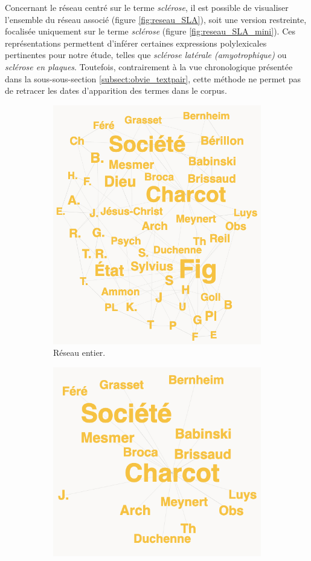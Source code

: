 Concernant le réseau centré sur le terme \textit{sclérose}, il est possible de visualiser l'ensemble du réseau associé (figure \ref{fig:reseau_SLA}), soit une version restreinte, focalisée uniquement sur le terme \textit{sclérose} (figure \ref{fig:reseau_SLA_mini}). Ces représentations permettent d'inférer certaines expressions polylexicales pertinentes pour notre étude, telles que \textit{sclérose latérale (amyotrophique)} ou \textit{sclérose en plaques}. Toutefois, contrairement à la vue chronologique présentée dans la sous-sous-section \ref{subsect:obvie_textpair}, cette méthode ne permet pas de retracer les dates d'apparition des termes dans le corpus. 

\begin{figure}[h]
	\centering
	\begin{subfigure}{.5\textwidth}
		\centering
		\includegraphics[width=.7\linewidth]{img/reseau_noms_propres.png}
		\caption{Réseau entier.}
		\label{fig:reseau_noms_propres_plein}
	\end{subfigure}%
	\begin{subfigure}{.53\textwidth}
		\centering
		\includegraphics[width=.835\linewidth]{img/reseau_noms_propres_mini.png}

\end{subfigure}
\end{figure}
